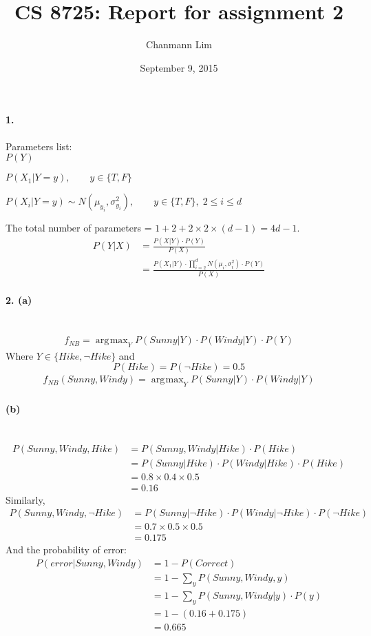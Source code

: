 \documentclass[a4paper]{article}
\DeclareMathOperator*{\argmax}{\arg\!\max}
\begin{document}
\title{CS 8725: Report for assignment 2}
\author{Chanmann Lim}
\date{September 9, 2015}
\maketitle

\paragraph{1.} Parameters list: \\

	$ P(Y) $
	
	$ P(X_1|Y = y), \qquad y \in \{T, F\} $
	
	$ P(X_i|Y = y) \sim N(\mu_{y_i}, \sigma_{y_i}^2), \qquad y \in \{T, F\}, \; 2 \leq i \leq d $
	
	The total number of parameters = $1 + 2 + 2 \times 2 \times (d-1) = 4d - 1 $.
	\begin{align}
		P(Y|X) &= \frac{P(X|Y) \cdot P(Y)}{P(X)} \\
			&= \frac{P(X_1|Y) \cdot \prod_{i=2}^d N(\mu_i, \sigma_i^2) \cdot P(Y)}{P(X)}
	\end{align} 

\paragraph{2. (a)} ~\\
	\begin{align}
		f_{NB} = \argmax_{Y} P(Sunny|Y) \cdot P(Windy|Y) \cdot P(Y)
	\end{align}
	Where $Y \in \{Hike, \neg Hike\}$ and 
	$$ P(Hike) = P(\neg Hike) = 0.5 $$
	\begin{align}
		f_{NB}(Sunny, Windy) = \argmax_{Y} P(Sunny|Y) \cdot P(Windy|Y)
	\end{align}
	
\paragraph{(b)} ~\\
	\begin{align}
		P(Sunny, Windy, Hike) &= P(Sunny, Windy | Hike) \cdot P(Hike)\\
			&= P(Sunny | Hike) \cdot P(Windy | Hike) \cdot P(Hike)\\
			&= 0.8 \times 0.4 \times 0.5\\
			&= 0.16
	\end{align}
	Similarly,
	\begin{align}
		P(Sunny, Windy, \neg Hike) &= P(Sunny | \neg Hike) \cdot P(Windy | \neg Hike) \cdot P(\neg Hike)\\
			&= 0.7 \times 0.5 \times 0.5\\
			&= 0.175
	\end{align}
	And the probability of error:
	\begin{align}
		P(error|Sunny, Windy) &= 1 - P(Correct) \\
			&= 1 - \sum_{y} P(Sunny, Windy, y) \\
			&= 1 - \sum_{y} P(Sunny, Windy | y) \cdot P(y) \\
			&= 1 - (0.16 + 0.175) \\
			&= 0.665
	\end{align}
\end{document}
